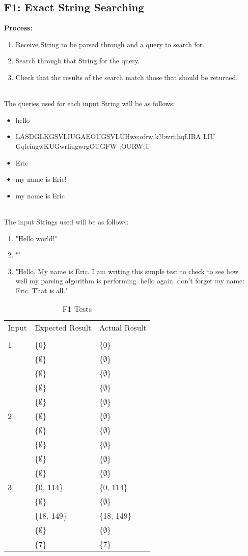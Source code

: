 \documentclass[12pt, titlepage]{article}
\begin{document}
\subsection{F1: Exact String Searching}
\textbf{Process:}
\begin{enumerate}
\item{Receive String to be parsed through and a query to search for.}
\item{Search through that String for the query.}
\item{Check that the results of the search match those that should be returned.}
\end{enumerate}
~\\
The queries used for each input String will be as follows:
\begin{itemize}
\item{hello}
\item{LASDGLKGSVLIUGAEOUGSVLUHwe;ofrw.k?bwri;hqf.IBA LIU GqleiugwKUGwrliugwrgOUGFW	;OURW;U}
\item{Eric}
\item{my name is Eric!}
\item{my name is Eric}
\end{itemize}
~\\
The input Strings used will be as follows:
\begin{enumerate}
\item{"Hello world!"}
\item{""}
\item{"Hello. My name is Eric. I am writing this simple test to check to see how well my parsing algorithm is performing. hello again, don't forget my name: Eric. That is all."}
\end{enumerate}
\begin{table}[h!]
\centering
\begin{tabular}{ p{7cm}  p{4cm}  p{4cm} }
	Input &Expected Result &Actual Result\\\\ \hline
	1 &\{0\}  &\{0\}\\ 
	~ &\{$\emptyset$\} &\{$\emptyset$\}\\
	~ &\{$\emptyset$\} &\{$\emptyset$\}\\
	~ &\{$\emptyset$\} &\{$\emptyset$\}\\
	~ &\{$\emptyset$\} &\{$\emptyset$\}\\ \hline
	2 &\{$\emptyset$\} &\{$\emptyset$\}\\ 
	~ &\{$\emptyset$\} &\{$\emptyset$\}\\
	~ &\{$\emptyset$\} &\{$\emptyset$\}\\
	~ &\{$\emptyset$\} &\{$\emptyset$\}\\
	~ &\{$\emptyset$\} &\{$\emptyset$\}\\ \hline
	3 &\{0, 114\}  &\{0, 114\}\\ 
	~ &\{$\emptyset$\} &\{$\emptyset$\}\\
	~ &\{18, 149\} &\{18, 149\}\\
	~ &\{$\emptyset$\} &\{$\emptyset$\}\\
	~ &\{7\} &\{7\}\\ \hline
\end{tabular}
\caption{F1 Tests}
\label{table:F1 Tests}
\end{table}
\end{document}
